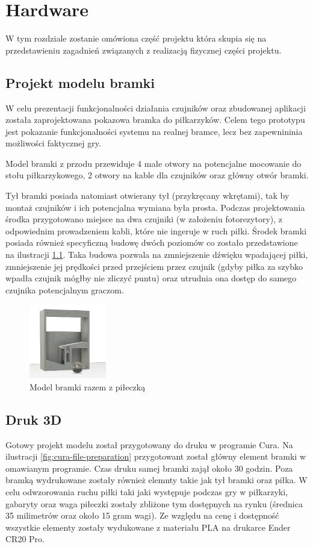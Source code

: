 \chapter{Hardware}
\label{ch:funplenop}
W tym rozdziale zostanie omówiona część projektu która skupia się na przedstawieniu zagadnień związanych z realizacją fizycznej części projektu.

\section{Projekt modelu bramki}
W celu prezentacji funkcjonalności działania czujników oraz zbudowanej aplikacji została zaprojektowana pokazowa bramka do piłkarzyków. Celem tego prototypu jest pokazanie funkcjonalności systemu na realnej bramce, lecz bez zapewnininia możliwości faktycznej gry. 

Model bramki z przodu przewiduje 4 małe otwory na potencjalne mocowanie do stołu piłkarzykowego, 2 otwory na kable dla czujników oraz główny otwór bramki.

Tył bramki posiada natomiast otwierany tył (przykręcany wkrętami), tak by montaż czujników i ich potencjalna wymiana była prosta. Podczas projektowania środka przygotowano miejsce na dwa czujniki (w założeniu fotorezytory), z odpowiednim prowadzeniem kabli, które nie ingeruje w ruch piłki. Środek bramki posiada również specyficzną budowę dwóch poziomów co zostało przedstawione na ilustracji \ref{fig:inside-of-gate-model}. Taka budowa pozwala na zmniejszenie dźwięku wpadającej piłki, zmniejszenie jej prędkości przed przejściem przez czujnik (gdyby piłka za szybko wpadła czujnik mógłby nie zliczyć puntu) oraz utrudnia ona dostęp do samego czujnika potencjalnym graczom.

\begin{figure}[h!]
  \centering
    \includegraphics[width=0.3\textwidth]{images/3D/gate_inside.png}
  \caption{Model bramki razem z piłeczką}
  \label{fig:inside-of-gate-model}
\end{figure}

\section{Druk 3D}
Gotowy projekt modelu został przygotowany do druku w programie Cura. Na ilustracji \ref{fig:cura-file-preparation} przygotowant został główny element bramki w omawianym programie. Czas druku samej bramki zajął około 30 godzin. Poza bramką wydrukowane zostały również elemnty takie jak tył bramki oraz piłka. W celu odwzorowania ruchu piłki taki jaki występuje podczas gry w piłkarzyki, gabaryty oraz waga piłeczki zostały zbliżone tym dostępnych na rynku (średnica 35 milimetrów oraz około 15 gram wagi). Ze względu na cenę i dostępność wszystkie elementy zostały wydukowane z materiału PLA na drukarce Ender CR20 Pro.

